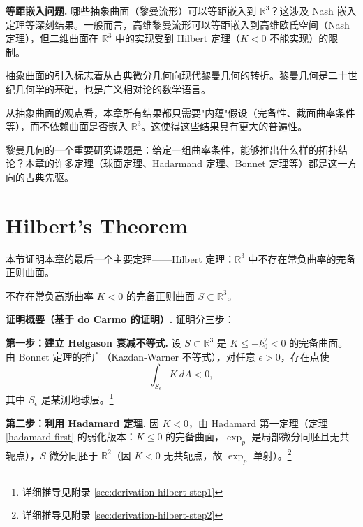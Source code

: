 \begin{Remark}
\textbf{等距嵌入问题.} 哪些抽象曲面（黎曼流形）可以等距嵌入到 $\mathbb{R}^3$？这涉及 Nash 嵌入定理等深刻结果。一般而言，高维黎曼流形可以等距嵌入到高维欧氏空间（Nash 定理），但二维曲面在 $\mathbb{R}^3$ 中的实现受到 Hilbert 定理（$K<0$ 不能实现）的限制。

\begin{Remark}
抽象曲面的引入标志着从古典微分几何向现代黎曼几何的转折。黎曼几何是二十世纪几何学的基础，也是广义相对论的数学语言。
\end{Remark}

\begin{Remark}
从抽象曲面的观点看，本章所有结果都只需要"内蕴"假设（完备性、截面曲率条件等），而不依赖曲面是否嵌入 $\mathbb{R}^3$。这使得这些结果具有更大的普遍性。
\end{Remark}

\begin{Remark}
黎曼几何的一个重要研究课题是：给定一组曲率条件，能够推出什么样的拓扑结论？本章的许多定理（球面定理、Hadarmand 定理、Bonnet 定理等）都是这一方向的古典先驱。
\end{Remark}

\section{Hilbert's Theorem}\label{sec:hilbert-theorem}

本节证明本章的最后一个主要定理——Hilbert 定理：$\mathbb{R}^3$ 中不存在常负曲率的完备正则曲面。

\begin{Theorem}[Hilbert]\label{hilbert-theorem}
不存在常负高斯曲率 $K < 0$ 的完备正则曲面 $S \subset \mathbb{R}^3$。
\end{Theorem}

\textbf{证明概要（基于 do Carmo 的证明）.} 证明分三步：

\textbf{第一步：建立 Helgason 衰减不等式.} 设 $S \subset \mathbb{R}^3$ 是 $K \leq -k_0^2 < 0$ 的完备曲面。由 Bonnet 定理的推广（Kazdan-Warner 不等式），对任意 $\epsilon>0$，存在点使
\[
\int_{S_\epsilon} K\,dA < 0,
\]
其中 $S_\epsilon$ 是某测地球层。\footnote{详细推导见附录 \cref{sec:derivation-hilbert-step1}}

\textbf{第二步：利用 Hadamard 定理.} 因 $K<0$，由 Hadamard 第一定理（定理 \ref{hadamard-first} 的弱化版本：$K \leq 0$ 的完备曲面，$\exp_p$ 是局部微分同胚且无共轭点），$S$ 微分同胚于 $\mathbb{R}^2$（因 $K<0$ 无共轭点，故 $\exp_p$ 单射）。\footnote{详细推导见附录 \cref{sec:derivation-hilbert-step2}}


\end{Remark}
